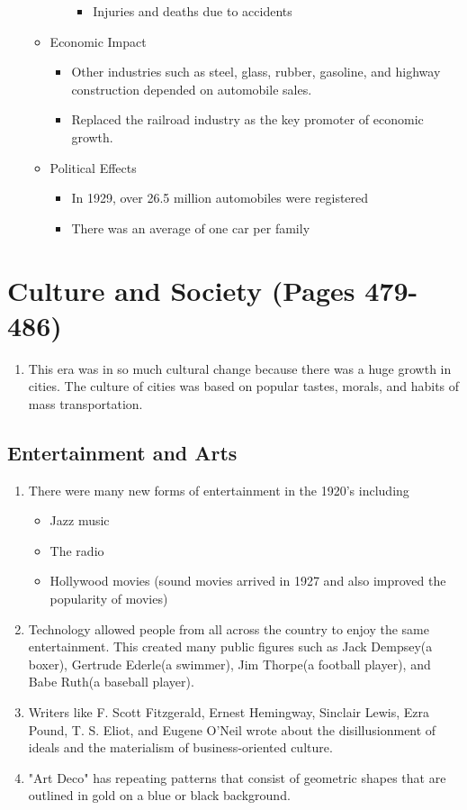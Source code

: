 \documentclass[12pt]{article} %
\begin{document}
\begin{enumerate}
\begin{itemize}
\begin{itemize}
\begin{itemize}
				\item Injuries and deaths due to accidents
			\end{itemize}
		\end{itemize}
		\item Economic Impact
		\begin{itemize}
			\item Other industries such as steel, glass, rubber, gasoline, and highway construction
				depended on automobile sales.
			\item Replaced the railroad industry as the key promoter of economic growth.
		\end{itemize}
		\item Political Effects
		\begin{itemize}
			\item In 1929, over 26.5 million automobiles were registered
			\item There was an average of one car per family
		\end{itemize}
	\end{itemize}
\end{enumerate}

\section{Culture and Society (Pages 479-486)}
\begin{enumerate}
	\item This era was in so much cultural change because there was a huge growth in cities. The culture
		of cities was based on popular tastes, morals, and habits of mass transportation.
\end{enumerate}
\subsection{Entertainment and Arts}
\begin{enumerate}[resume]
	\item There were many new forms of entertainment in the 1920's including 
	\begin{itemize}
		\item Jazz music
		\item The radio
		\item Hollywood movies (sound movies arrived in 1927 and also improved the popularity of movies)
	\end{itemize}
	\item Technology allowed people from all across the country to enjoy the same entertainment. This 
		created many public figures such as Jack Dempsey(a boxer), Gertrude Ederle(a swimmer), Jim Thorpe(a football player),
		and Babe Ruth(a baseball player).
	\item Writers like F. Scott Fitzgerald, Ernest Hemingway, Sinclair Lewis, Ezra Pound, T. S. Eliot, 
		and Eugene O'Neil wrote about the disillusionment of ideals and the materialism of business-oriented
		culture.
	\item "Art Deco" has repeating patterns that consist of geometric shapes that are outlined in gold on
		a blue or black background.
\end{enumerate}
\end{document}
